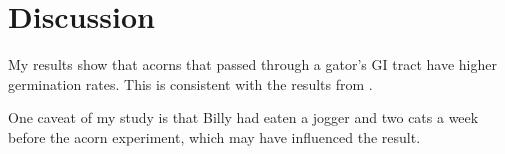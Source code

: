 \documentclass[../main.tex]{article}
\begin{document}
\section{Discussion}

My results show that acorns that passed through a gator's GI tract have higher germination rates. This is consistent with the results from \textcite{CavenderBares2027}.

One caveat of my study is that Billy had eaten a jogger and two cats a week before the acorn experiment, which may have influenced the result.
\end{document}
